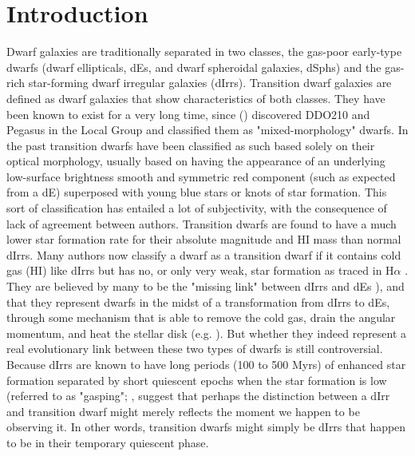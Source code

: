 \documentclass[12pt,preprint]{emulateapj}
\begin{document}

\section{Introduction}

Dwarf galaxies are traditionally separated in two classes, the gas-poor early-type dwarfs (dwarf ellipticals, dEs, and dwarf spheroidal galaxies, dSphs) 
and the gas-rich star-forming dwarf irregular galaxies (dIrrs). Transition dwarf galaxies are defined as dwarf galaxies that show characteristics of both
classes. They have been known to exist for a very long time, since (\cite{vdb59}) discovered DDO210 and Pegasus in the Local Group and classified 
them as "mixed-morphology" dwarfs. In the past transition dwarfs have been classified as such based solely on their optical morphology, usually based 
on having the appearance of an underlying low-surface brightness smooth and symmetric red component (such as expected from a dE) superposed 
with young blue stars or knots of star formation. This sort of classification has entailed a lot of subjectivity, with the consequence of lack of agreement 
between authors. Transition dwarfs are found to have a much lower star formation rate for their absolute magnitude and HI mass than normal dIrrs. 
Many authors now classify a dwarf as a transition dwarf if it contains cold gas (HI) like dIrrs but has no, or only very weak, star formation  as traced in H$\alpha$  
\citep{m98,ggh03,scm03a,cds09,w11,mcq15}. They are believed by many to be the "missing link" between dIrrs and dEs \citep{hhmh97,ksg99,li13}), and that they 
represent dwarfs in the midst of a transformation from dIrrs to dEs, through some mechanism that is able to remove the cold gas, drain the angular 
momentum, and heat the stellar disk (e.g. \cite{scm03a}). But whether they indeed represent a real evolutionary link between these two types of dwarfs 
is still controversial. Because dIrrs are known to have long periods (100 to 500 Myrs) of enhanced star formation separated by short quiescent epochs 
when the star formation is low (referred to as "gasping"; \cite{t91}, \cite{mcc12} suggest that perhaps the distinction between a dIrr and transition dwarf 
might merely reflects the moment we happen to be observing it. In other words, transition dwarfs might simply be dIrrs that happen to be in their temporary 
quiescent phase.
\end{document}
